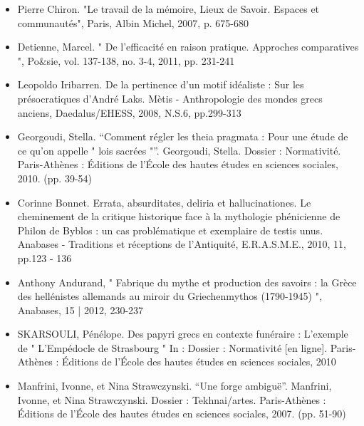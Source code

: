 \documentclass{article}
\begin{document}
\begin{itemize}
    \item Pierre Chiron. "Le travail de la mémoire, Lieux de Savoir. Espaces et communautés", Paris, Albin Michel, 2007, p. 675-680
    \item Detienne, Marcel. " De l’efficacité en raison pratique. Approches comparatives ", Po\&sie, vol. 137-138, no. 3-4, 2011, pp. 231-241
    \item Leopoldo Iribarren. De la pertinence d’un motif idéaliste : Sur les présocratiques d'André Laks. Mètis - Anthropologie des mondes grecs anciens, Daedalus/EHESS, 2008, N.S.6, pp.299-313
    \item Georgoudi, Stella. “Comment régler les theia pragmata : Pour une étude de ce qu’on appelle " lois sacrées "”. Georgoudi, Stella. Dossier : Normativité. Paris-Athènes : Éditions de l’École des hautes études en sciences sociales, 2010. (pp. 39-54)
    \item Corinne Bonnet. Errata, absurditates, deliria et hallucinationes. Le cheminement de la critique historique face à la mythologie phénicienne de Philon de Byblos : un cas problématique et exemplaire de testis unus. Anabases - Traditions et réceptions de l’Antiquité, E.R.A.S.M.E., 2010, 11, pp.123 - 136
    \item Anthony Andurand, " Fabrique du mythe et production des savoirs : la Grèce des hellénistes allemands au miroir du Griechenmythos (1790-1945) ", Anabases, 15 | 2012, 230-237
    \item SKARSOULI, Pénélope. Des papyri grecs en contexte funéraire : L’exemple de " L’Empédocle de Strasbourg " In : Dossier : Normativité [en ligne]. Paris-Athènes : Éditions de l’École des hautes études en sciences sociales, 2010
    \item Manfrini, Ivonne, et Nina Strawczynski. “Une forge ambiguë”. Manfrini, Ivonne, et Nina Strawczynski. Dossier : Tekhnai/artes. Paris-Athènes : Éditions de l’École des hautes études en sciences sociales, 2007. (pp. 51-90)
\end{itemize}
\end{document}
